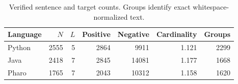 \begin{table}[htbp]
\centering\small
\caption{Verified sentence and target counts. Groups identify exact whitespace-normalized text.}\label{tab:data}
\begin{tabular}{lrrrrrr}\toprule
Language & $N$ & $L$ & Positive & Negative & Cardinality & Groups\\\midrule
Python & 2555 & 5 & 2864 & 9911 & 1.121 & 2299\\
Java & 2418 & 7 & 2845 & 14081 & 1.177 & 1668\\
Pharo & 1765 & 7 & 2043 & 10312 & 1.158 & 1620\\
\bottomrule\end{tabular}
\end{table}
